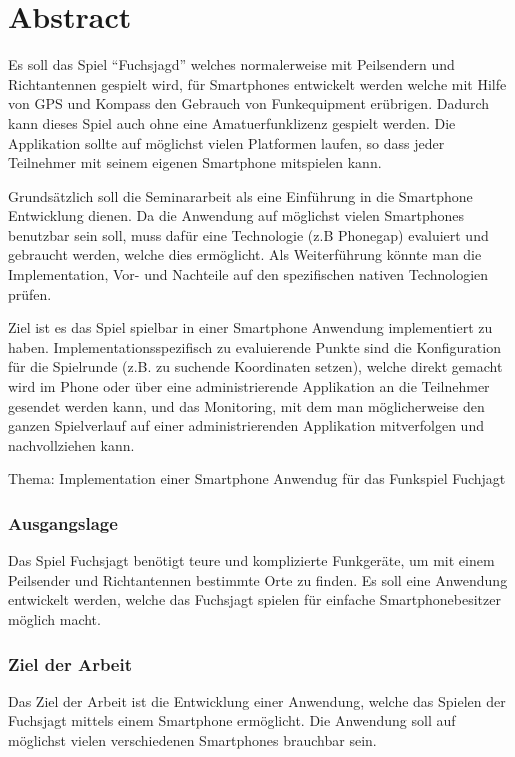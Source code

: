 
\newpage
\section{Abstract} %
\label{sec:Abstract}
Es soll das Spiel “Fuchsjagd” welches normalerweise mit Peilsendern und Richtantennen gespielt wird, für Smartphones entwickelt werden welche mit Hilfe von GPS und Kompass den Gebrauch von Funkequipment erübrigen.
Dadurch kann dieses Spiel auch ohne eine Amatuerfunklizenz gespielt werden. Die Applikation sollte auf möglichst vielen Platformen laufen, so dass jeder Teilnehmer mit seinem eigenen Smartphone mitspielen kann.

Grundsätzlich soll die Seminararbeit als eine Einführung in die Smartphone Entwicklung dienen. Da die Anwendung auf möglichst vielen Smartphones benutzbar sein soll, muss dafür eine Technologie (z.B Phonegap) evaluiert und gebraucht werden, welche dies ermöglicht. Als Weiterführung könnte man die Implementation, Vor- und Nachteile auf den spezifischen nativen Technologien prüfen.  

Ziel ist es das Spiel spielbar in einer Smartphone Anwendung implementiert zu haben. Implementationsspezifisch zu evaluierende Punkte sind die Konfiguration für die Spielrunde (z.B. zu suchende Koordinaten setzen), welche direkt gemacht wird im Phone oder über eine administrierende Applikation an die Teilnehmer gesendet werden kann, und das Monitoring, mit dem man möglicherweise den ganzen Spielverlauf auf einer administrierenden Applikation mitverfolgen und nachvollziehen kann.

Thema: Implementation einer Smartphone Anwendug für das Funkspiel Fuchjagt

\subsubsection{Ausgangslage} %
\label{ssub:Ausgangslage}
Das Spiel Fuchsjagt benötigt teure und komplizierte Funkgeräte, um mit einem Peilsender und Richtantennen bestimmte Orte zu finden. Es soll eine Anwendung entwickelt werden, welche das Fuchsjagt spielen für einfache Smartphonebesitzer möglich macht.

\subsubsection{Ziel der Arbeit} %
\label{ssub:Ziel der Arbeit}
Das Ziel der Arbeit ist die Entwicklung einer Anwendung, welche das Spielen der Fuchsjagt mittels einem Smartphone ermöglicht. Die Anwendung soll auf möglichst vielen verschiedenen Smartphones brauchbar sein.

